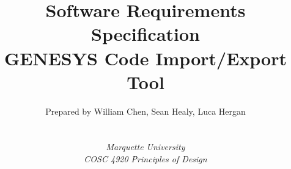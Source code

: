 
\def\Company{Consultancy}
\def\Institute{\textit{Marquette University}}
\def\Course{\textit{COSC 4920 Principles of Design}}
\def\Module{\textit{}}
\def\Docent{\textit{}}
\def\Assistant{\textit{}}

\def\BoldTitle{Software Requirements Specification}

\def\Subtitle{GENESYS Code Import/Export Tool \\}
\def\Authors{Prepared by William Chen, Sean Healy, Luca Hergan } 
\def\Shortname{A.Sandu}


\title{\textbf{\BoldTitle}\\\Subtitle}
\author{\Authors \\ \\ \\ \Institute\\ \Course\\ \Module\\ \Docent\\ \Assistant}
\date{}

